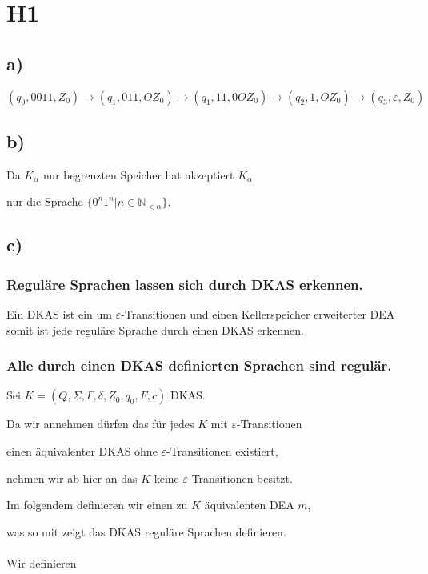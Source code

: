 \section*{H1}

\subsection*{a)}

$(q_{0},0011,Z_{0}) \to (q_{1},011,OZ_{0}) \to (q_{1},11,0OZ_{0}) \to (q_{2},1,OZ_{0}) \to (q_{3},\varepsilon,Z_{0})$

\subsection*{b)}

Da $K_{\alpha}$ nur begrenzten Speicher hat akzeptiert $K_{\alpha}$ 

nur die Sprache $\{0^{n}1^{n}|n \in \mathbb{N}_{<\alpha}\}$.

\subsection*{c)}

\subsubsection*{Reguläre Sprachen lassen sich durch DKAS erkennen.}
Ein DKAS ist ein um $\varepsilon$-Transitionen und einen Kellerspeicher erweiterter DEA
somit ist jede reguläre Sprache durch einen DKAS erkennen.

\subsubsection*{Alle durch einen DKAS definierten Sprachen sind regulär.} 

Sei $K = (Q,\Sigma,\Gamma,\delta,Z_{0},q_{0},F,c)$ DKAS.

Da wir annehmen dürfen das für jedes $K$ mit $\varepsilon$-Transitionen

einen äquivalenter DKAS ohne $\varepsilon$-Transitionen existiert,

nehmen wir ab hier an das $K$ keine $\varepsilon$-Transitionen besitzt.

Im folgendem definieren wir einen zu $K$ äquivalenten DEA $m$,

was so mit zeigt das DKAS reguläre Sprachen definieren.

\paragraph{} Wir definieren

